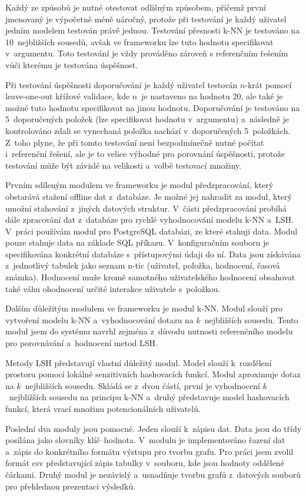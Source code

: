 \documentclass[11pt]{article}
\begin{document}
Každý ze způsobů je nutné otestovat odlišným způsobem, přičemž první jmenovaný je výpočetně méně náročný, protože při testování je každý uživatel jedním modelem testován právě jednou. Testování přesnosti k-NN je testováno na 10~nejbližších sousedů, avšak ve frameworku lze tuto hodnotu specifikovat v~argumentu. Toto testování je vždy prováděno zároveň s referenčním řešením vůči kterému je testována úspěšnost. 

Při testování úspěšnosti doporučování je každý uživatel testován $n$-krát pomocí leave-one-out křížové validace, kde $n$~je nastaveno na hodnotu 20, ale také je možné tuto hodnotu specifikovat na jinou hodnotu. Doporučování je testováno na 5~doporučených položek (lze specifikovat hodnotu v~argumentu) a~následně je kontrolováno zdali se vynechaná položka nachází v~doporučených 5~položkách. Z~toho plyne, že při tomto testování není bezpodmínečně nutné počítat i~referenční řešení, ale je to velice výhodné pro porovnání úspěšnosti, protože testování může být závislé na velikosti a~volbě testovací množiny.

Prvním sdíleným modulem ve frameworku je modul předzpracování, který obstarává stažení offline dat z~databáze. Je možné jej nahradit za modul, který umožní stahování z~jiných datových struktur. V~části předzpracování probíhá dále zpracování dat z~databáze pro rychlé vyhodnocování modelu k-NN a~LSH. V~práci používám modul pro PostgreSQL databázi, ze které stahuji data. Modul pouze stahuje data na základe SQL příkazu. V~konfiguračním souboru je specifikována konkrétní databáze s~přístupovými údaji do ní. Data jsou získávána z~jednotlivý tabulek jako seznam n-tic (uživatel, položka, hodnocení, časová známka). Hodnocení muže kromě samotného uživatelského hodnocení obsahovat také váhu ohodnocení určité interakce uživatele s~položkou.

Dalším důležitým modulem ve frameworku je modul k-NN. Modul slouží pro vytvoření modelu k-NN a~vyhodnocování dotazu na $k$~nejbližších sousedu. Tento modul jsem do systému navrhl zejména z~důvodu nutnosti referenčního modelu pro porovnávání a~hodnocení metod LSH.

Metody LSH představují vlastní důležitý modul. Model slouží k~rozdělení
prostoru pomocí lokálně senzitivních hashovacích funkcí. Modul aproximuje dotaz na $k$~nejbližších sousedu. Skládá se z~dvou částí, první je vyhodnocení $k$~nejbližších sousedu na principu k-NN a~druhý představuje model hashovacích funkcí, která vrací množinu potencionálních uživatelů.

Poslední dva moduly jsou pomocné. Jeden slouží k~zápisu dat. Data jsou do třídy posílána jako slovníky klíč–hodnota. V~modulu je implementováno řazení dat a~zápis do konkrétního formátu výstupu pro tvorbu grafu. Pro práci jsem zvolil formát csv představující zápis tabulky v~souboru, kde jsou hodnoty oddělené čárkami. Druhý modul je nezávislý a~usnadňuje tvorbu grafů z~datových souborů pro přehlednou prezentaci výsledků.
\end{document}
